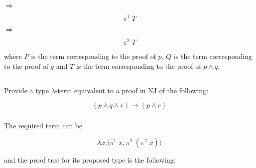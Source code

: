 \documentclass{article}
\begin{document}
\begin{minipage}[c][2cm][c]{.4\textwidth}
\begin{mathpar}
\end{mathpar}
\end{minipage}
$\Longrightarrow$
\begin{minipage}[c]{.4\textwidth}
$$\pi^1\;T$$
\end{minipage}

\begin{minipage}[c][2cm][c]{.4\textwidth}
\begin{mathpar}
\end{mathpar}
\end{minipage}
$\Longrightarrow$
\begin{minipage}[c]{.4\textwidth}
$$\pi^2\;T$$
\end{minipage}

where $P$ is the term corresponding to the proof of $p$, 
$Q$ is the term corresponding to the proof of $q$
and $T$ is the term corresponding to the proof of 
$p \land q$.

\subsection{}\label{ex:3}

Provide a type $\lambda$-term equivalent to a proof in 
NJ of the following:

$$(p \land q \land r) \rightarrow (p \land r)$$

\subsubsection{}

The required term can be

$$
  \lambda x. \langle \pi^1\;x, \pi^2\;(\pi^2\;x) \rangle
$$

and the proof tree for its proposed type is the following:

\begin{mathpar}
\end{mathpar}
\end{document}
